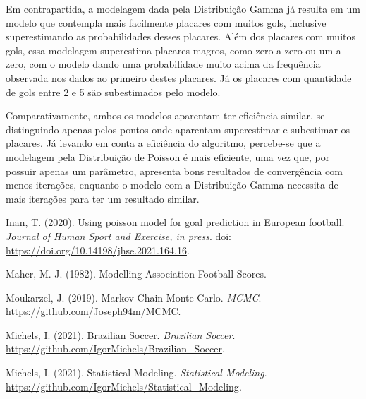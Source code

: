 \documentclass[11pt,letterpaper,twocolumn]{article}
\begin{document}
Em contrapartida, a modelagem dada pela Distribuição Gamma já resulta em um modelo que contempla mais facilmente placares com muitos gols, inclusive superestimando as probabilidades desses placares. Além dos placares com muitos gols, essa modelagem superestima placares magros, como zero a zero ou um a zero, com o modelo dando uma probabilidade muito acima da frequência observada nos dados ao primeiro destes placares. Já os placares com quantidade de gols entre 2 e 5 são subestimados pelo modelo.

Comparativamente, ambos os modelos aparentam ter eficiência similar, se distinguindo apenas pelos pontos onde aparentam superestimar e subestimar os placares. Já levando em conta a eficiência do algoritmo, percebe-se que a modelagem pela Distribuição de Poisson é mais eficiente, uma vez que, por possuir apenas um parâmetro, apresenta bons resultados de convergência com menos iterações, enquanto o modelo com a Distribuição Gamma necessita de mais iterações para ter um resultado similar.

\newpage
\begin{thebibliography}{9}

 Inan, T. (2020). Using poisson model for goal prediction in European football. \textit{Journal of Human Sport and Exercise, in press}. doi: \url{https://doi.org/10.14198/jhse.2021.164.16}.

 Maher, M. J. (1982). Modelling Association Football Scores.

 Moukarzel, J. (2019). Markov Chain Monte Carlo. \textit{MCMC}. \url{https://github.com/Joseph94m/MCMC}.

 Michels, I. (2021). Brazilian Soccer. \textit{Brazilian Soccer}. \url{https://github.com/IgorMichels/Brazilian_Soccer}.

 Michels, I. (2021). Statistical Modeling. \textit{Statistical Modeling}. \url{https://github.com/IgorMichels/Statistical_Modeling}.

\end{thebibliography}
\end{document}
